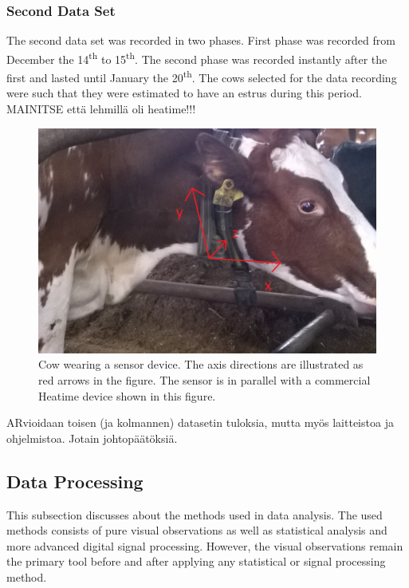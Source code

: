 \documentclass[english,12pt,a4paper,pdftex,elec,utf8]{aaltothesis}
\begin{document}
\subsubsection*{Second Data Set} \label{seconddatasetsection}

The second data set was recorded in two phases. First phase was recorded from December the 14\textsuperscript{th} to 15\textsuperscript{th}. The second phase was recorded instantly after the first and lasted until January the 20\textsuperscript{th}. The cows selected for the data recording were such that they were estimated to have an estrus during this period. \\

MAINITSE että lehmillä oli heatime!!!

\begin{figure}[thb]
\centering
\includegraphics[width = 0.75 \textwidth]{figures/sensorikaulassa1.png}
\caption{Cow wearing a sensor device. The axis directions are illustrated as red arrows in the figure. The sensor is in parallel with a commercial Heatime device shown in this figure.}\label{sensorikaulassakuva}
\end{figure}

ARvioidaan toisen (ja kolmannen) datasetin tuloksia, mutta myös laitteistoa ja ohjelmistoa. Jotain johtopäätöksiä.



\subsection{Data Processing} \label{dataprocessingsection}

This subsection discusses about the methods used in data analysis. The used methods consists of pure visual observations as well as statistical analysis and more advanced digital signal processing. However, the visual observations remain the primary tool before and after applying any statistical or signal processing method.
\end{document}
